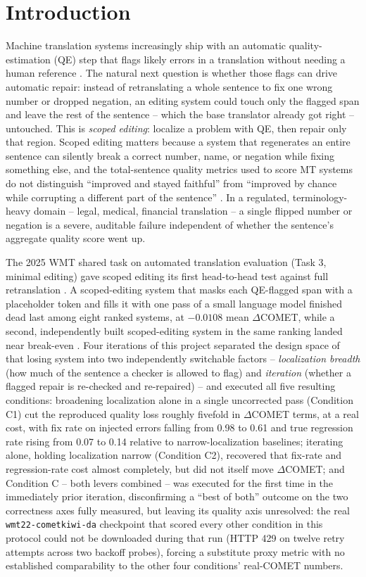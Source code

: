 \documentclass[11pt,letterpaper]{article}
\begin{document}
\section{Introduction}

Machine translation systems increasingly ship with an automatic quality-estimation (QE) step that flags likely errors in a translation without needing a human reference \citep{Lavie2025}. The natural next question is whether those flags can drive automatic repair: instead of retranslating a whole sentence to fix one wrong number or dropped negation, an editing system could touch only the flagged span and leave the rest of the sentence -- which the base translator already got right -- untouched. This is \emph{scoped editing}: localize a problem with QE, then repair only that region. Scoped editing matters because a system that regenerates an entire sentence can silently break a correct number, name, or negation while fixing something else, and the total-sentence quality metrics used to score MT systems do not distinguish ``improved and stayed faithful'' from ``improved by chance while corrupting a different part of the sentence'' \citep{Rei2022}. In a regulated, terminology-heavy domain -- legal, medical, financial translation -- a single flipped number or negation is a severe, auditable failure independent of whether the sentence's aggregate quality score went up.

The 2025 WMT shared task on automated translation evaluation (Task 3, minimal editing) gave scoped editing its first head-to-head test against full retranslation \citep{Lavie2025}. A scoped-editing system that masks each QE-flagged span with a placeholder token and fills it with one pass of a small language model finished dead last among eight ranked systems, at $-0.0108$ mean $\Delta$COMET, while a second, independently built scoped-editing system in the same ranking landed near break-even \citep{Lavie2025,Padmanabhan2025}. Four iterations of this project separated the design space of that losing system into two independently switchable factors -- \emph{localization breadth} (how much of the sentence a checker is allowed to flag) and \emph{iteration} (whether a flagged repair is re-checked and re-repaired) -- and executed all five resulting conditions: broadening localization alone in a single uncorrected pass (Condition C1) cut the reproduced quality loss roughly fivefold in $\Delta$COMET terms, at a real cost, with fix rate on injected errors falling from 0.98 to 0.61 and true regression rate rising from 0.07 to 0.14 relative to narrow-localization baselines; iterating alone, holding localization narrow (Condition C2), recovered that fix-rate and regression-rate cost almost completely, but did not itself move $\Delta$COMET; and Condition C -- both levers combined -- was executed for the first time in the immediately prior iteration, disconfirming a ``best of both'' outcome on the two correctness axes fully measured, but leaving its quality axis unresolved: the real \texttt{wmt22-cometkiwi-da} checkpoint that scored every other condition in this protocol could not be downloaded during that run (HTTP 429 on twelve retry attempts across two backoff probes), forcing a substitute proxy metric with no established comparability to the other four conditions' real-COMET numbers.
\end{document}
